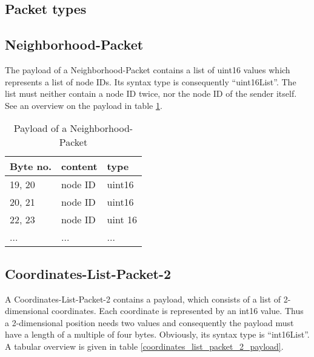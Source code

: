\subsection{Packet types}
\label{packet_types}

\subsection{Neighborhood-Packet}
\label{subsection:neighborhood_packet}

The payload of a Neighborhood-Packet contains a list of uint16 values which represents a list of node IDs.
Its syntax type is consequently ``uint16List''. The list must neither contain a node ID twice, nor the node
ID of the sender itself. See an overview on the payload in table \ref{neighborhood_packet_payload}.

\begin{table}[htdp]
  \begin{center}
    \begin{tabular}{l|l|l}
      \textbf{Byte no.} & \textbf{content} & \textbf{type} \\
      \hline
      \hline
      19, 20 & node ID & uint16 \\
      \hline
      20, 21 & node ID & uint16 \\
      \hline
      22, 23 & node ID & uint 16 \\
      \hline
      ... & ... & ... \\
    \end{tabular}
    \caption{Payload of a Neighborhood-Packet}
    \label{neighborhood_packet_payload}
  \end{center}
\end{table}

\subsection{Coordinates-List-Packet-2}
\label{subsection:coordinates-list-packet-2}

A Coordinates-List-Packet-2 contains a payload, which consists of a list of 2-dimensional coordinates. Each coordinate is
represented by an int16 value. Thus a 2-dimensional position needs two values and consequently the payload must have a length
of a multiple of four bytes. Obviously, its syntax type is ``int16List''. A tabular overview is given in table
\ref{coordinates_list_packet_2_payload}.

